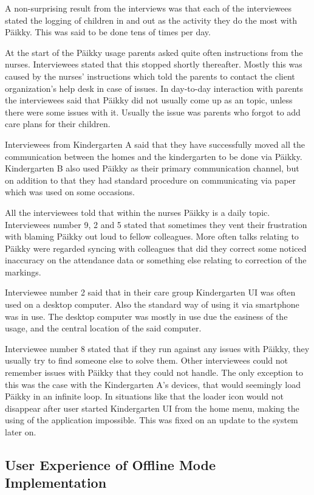 A non-surprising result from the interviews was that each of the interviewees stated the logging of children in and out as the activity they do the most with Päikky. This was said to be done tens of times per day.

At the start of the Päikky usage parents asked quite often instructions from the nurses. Interviewees stated that this stopped shortly thereafter. Mostly this was caused by the nurses' instructions which told the parents to contact the client organization's help desk in case of issues. In day-to-day interaction with parents the interviewees said that Päikky did not usually come up as an topic, unless there were some issues with it. Usually the issue was parents who forgot to add care plans for their children.

Interviewees from Kindergarten A said that they have successfully moved all the communication between the homes and the kindergarten to be done via Päikky. Kindergarten B also used Päikky as their primary communication channel, but on addition to that they had standard procedure on communicating via paper which was used on some occasions.

All the interviewees told that within the nurses Päikky is a daily topic. Interviewees number 9, 2 and 5 stated that sometimes they vent their frustration with blaming Päikky out loud to fellow colleagues. More often talks relating to Päikky were regarded syncing with colleagues that did they correct some noticed inaccuracy on the attendance data or something else relating to correction of the markings.

Interviewee number 2 said that in their care group Kindergarten UI was often used on a desktop computer. Also the standard way of using it via smartphone was in use. The desktop computer was mostly in use due the easiness of the usage, and the central location of the said computer. 

Interviewee number 8 stated that if they run against any issues with Päikky, they usually try to find someone else to solve them. Other interviewees could not remember issues with Päikky that they could not handle. The only exception to this was the case with the Kindergarten A's devices, that would seemingly load Päikky in an infinite loop. In situations like that the loader icon would not disappear after user started Kindergarten UI from the home menu, making the using of the application impossible. This was fixed on an update to the system later on.


\subsection{User Experience of Offline Mode Implementation}


